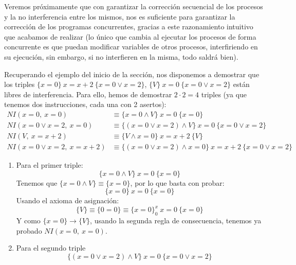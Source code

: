 Veremos próximamente que con garantizar la corrección secuencial de los procesos y la no interferencia entre los mismos, nos es suficiente para garantizar la corrección de los programas concurrentes, gracias a este razonamiento intuitivo que acabamos de realizar (lo único que cambia al ejecutar los procesos de forma concurrente es que puedan modificar variables de otros procesos, interfiriendo en su ejecución, sin embargo, si no interfieren en la misma, todo saldrá bien).

\begin{ejemplo}
    Recuperando el ejemplo del inicio de la sección, nos disponemos a demostrar que los triples $\{x=0\}\ x=x+2\ \{x=0 \lor x=2\}$, $\{V\}\ x=0\ \{x=0 \lor x=2\}$ están libres de interferencia. Para ello, hemos de demostrar $2\cdot 2=4$ triples (ya que tenemos dos instrucciones, cada una con 2 asertos):
    \begin{align*}
        NI(x=0,\ x=0) &\equiv \{x=0 \land V\}\ x=0\ \{x=0\} \\
        NI(x=0 \lor x=2,\ x=0) &\equiv \{(x=0 \lor x=2) \land V\}\ x=0\ \{x=0 \lor x=2\} \\
        NI(V,\ x=x+2) &\equiv \{V \land x=0\}\ x=x+2\ \{V\} \\
        NI(x=0 \lor x=2,\ x=x+2) &\equiv \{(x=0 \lor x=2) \land x=0\}\ x=x+2\ \{x=0 \lor x=2\}
    \end{align*}
    \begin{enumerate}
        \item Para el primer triple:
            \begin{equation*}
                \{x=0 \land V\}\ x=0\ \{x=0\}
            \end{equation*}
            Tenemos que $\{x=0 \land V\}\equiv \{x=0\}$, por lo que basta con probar:
            \begin{equation*}
                \{x=0\}\ x=0\ \{x=0\}
            \end{equation*}
            Usando el axioma de asignación:
            \begin{equation*}
                \{V\} \equiv \{0=0\} \equiv \{x=0\}^x_0\ x=0\ \{x=0\}
            \end{equation*}
            Y como $\{x=0\}\rightarrow\{V\}$, usando la segunda regla de consecuencia, tenemos ya probado $NI(x=0,\ x=0)$.
        \item Para el segundo triple
            \begin{equation*}
                \{(x=0 \lor x=2) \land V\}\ x=0\ \{x=0 \lor x=2\}

\end{equation*}
\end{enumerate}
\end{ejemplo}
